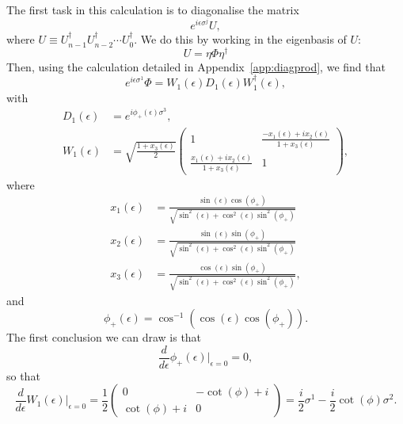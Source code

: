 \documentclass[12pt]{amsart}
\theoremstyle{definition}
\theoremstyle{remark}
\numberwithin{equation}{section}
\begin{document}
The first task in this calculation is to diagonalise the matrix
\begin{equation}
	e^{i\epsilon \sigma^j}U,
\end{equation}
where $U \equiv U_{n-1}^\dag U_{n-2}^\dag \cdots U_0^\dag$. We do this by working in the eigenbasis of $U$:
\begin{equation}
	U = \eta \Phi \eta^\dag
\end{equation}
Then, using the calculation detailed in Appendix~\ref{app:diagprod}, we find that
\begin{equation}
	e^{i\epsilon \sigma^1}\Phi = W_1(\epsilon) D_1(\epsilon) W_1^\dag(\epsilon),
\end{equation}
with
\begin{equation}
	\begin{split}
		D_1(\epsilon) &= e^{i\phi_+(\epsilon) \sigma^3}, \\
		W_1(\epsilon) &= \sqrt{\frac{1+x_3(\epsilon)}{2}}\begin{pmatrix} 1 & \frac{-x_1(\epsilon)+ix_2(\epsilon)}{1+x_3(\epsilon)}\\ \frac{x_1(\epsilon)+ix_2(\epsilon)}{1+x_3(\epsilon)} & 1\end{pmatrix},
	\end{split}
\end{equation}
where
\begin{equation}
	\begin{split}
		x_1(\epsilon) &= \frac{\sin(\epsilon)\cos(\phi_+)}{\sqrt{\sin^2(\epsilon) + \cos^2(\epsilon)\sin^2(\phi_+)}}\\
		x_2(\epsilon) &= \frac{\sin(\epsilon)\sin(\phi_+)}{\sqrt{\sin^2(\epsilon) + \cos^2(\epsilon)\sin^2(\phi_+)}}\\
		x_3(\epsilon) &= \frac{\cos(\epsilon)\sin(\phi_+)}{\sqrt{\sin^2(\epsilon) + \cos^2(\epsilon)\sin^2(\phi_+)}},
	\end{split}
\end{equation}
and
\begin{equation}
	\phi_+(\epsilon) = \cos^{-1}(\cos(\epsilon)\cos(\phi_+)).
\end{equation}
The first conclusion we can draw is that
\begin{equation}
	\frac{d}{d\epsilon}\phi_+(\epsilon)\bigg|_{\epsilon = 0} = 0,
\end{equation}
so that
\begin{equation}
	\frac{d}{d\epsilon} W_1(\epsilon)\bigg|_{\epsilon =0} = \frac{1}{{2}}\begin{pmatrix} 0 & -\cot(\phi)+i\\ \cot(\phi)+i & 0\end{pmatrix} = \frac{i}{2}\sigma^1 -\frac{i}{2}\cot(\phi)\sigma^2.
\end{equation}
\end{document}
